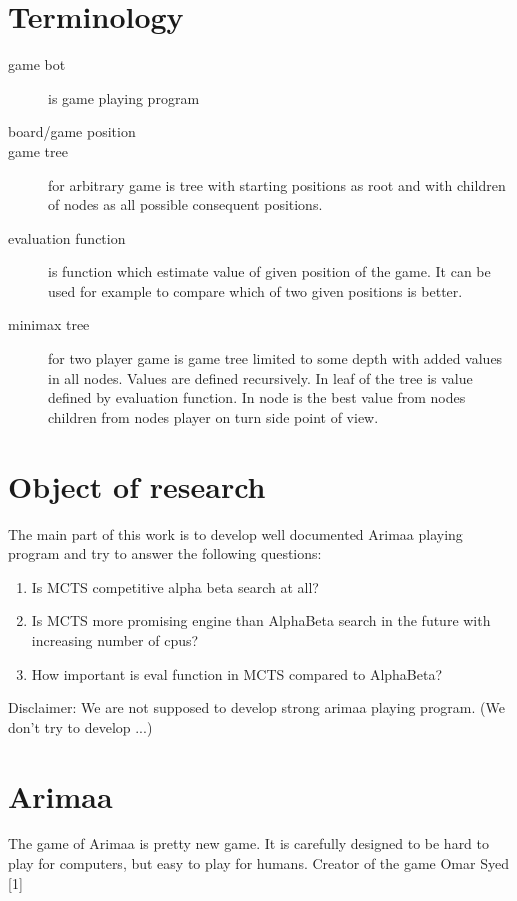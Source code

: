 \documentclass[12pt,titlepage,fleqn]{report}
\begin{document}
\section{Terminology}
\begin{description}
\item[game bot] is game playing program
\item[board/game position]
\item[game tree] for arbitrary game is tree with starting positions as root and
   with children of nodes as all possible consequent positions.
\item[evaluation function] is function which estimate value of given position of the game. It can be used for example to compare which of two given positions is better.
\item[minimax tree] for two player game is game tree limited to some depth with
added values in all nodes. Values are defined recursively. In leaf of the tree
is value defined by evaluation function. In node is the best value from nodes
children from nodes player on turn side point of view.
\end{description}

\section{Object of research}
The main part of this work is to develop well documented Arimaa playing program
and try to answer the following questions:

\begin{enumerate}
\item Is MCTS competitive alpha beta search at all?
\item Is MCTS more promising engine than AlphaBeta search in the future with
      increasing number of cpus?
\item How important is eval function in MCTS compared to AlphaBeta?
\end{enumerate}

Disclaimer: We are not supposed to develop strong arimaa playing program. (We don't try to develop ...)

\section{Arimaa}
The game of Arimaa is pretty new game. It is carefully designed to be hard to
play for computers, but easy to play for humans. Creator of the game Omar
Syed [1]
\end{document}
